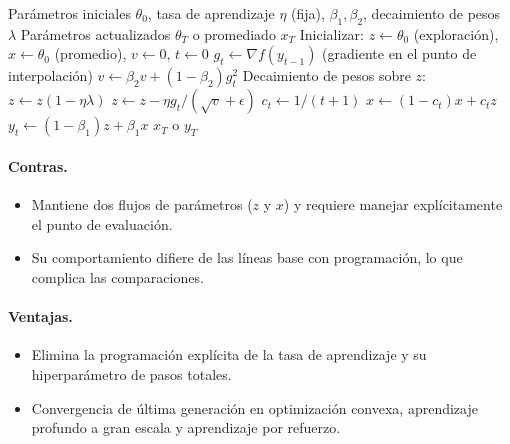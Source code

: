 \begin{algorithm}[H]
\caption{Schedule-Free AdamW}
\label{alg:schedulefree}
\begin{algorithmic}[1]
\Require Parámetros iniciales $\theta_0$, tasa de aprendizaje $\eta$ (fija), $\beta_1, \beta_2$, decaimiento de pesos $\lambda$
\Ensure Parámetros actualizados $\theta_T$ o promediado $x_T$
\State Inicializar: $z \gets \theta_0$ (exploración), $x \gets \theta_0$ (promedio), $v \gets 0$, $t \gets 0$
    \State $g_t \gets \nabla f(y_{t-1})$ (gradiente en el punto de interpolación)
    \State $v \gets \beta_2 v + (1-\beta_2) g_t^2$ 
    \State Decaimiento de pesos sobre $z$: $z \gets z(1 - \eta\lambda)$
    \State $z \gets z - \eta g_t / (\sqrt{v} + \epsilon)$ 
    \State $c_t \gets 1 / (t+1)$ 
    \State $x \gets (1-c_t) x + c_t z$ 
    \State $y_t \gets (1-\beta_1) z + \beta_1 x$ 
\EndFor
\Return $x_T$ o $y_T$
\end{algorithmic}
\end{algorithm}

\paragraph{Contras.}
\begin{itemize}[leftmargin=*]
\item Mantiene dos flujos de parámetros ($z$ y $x$) y requiere manejar explícitamente el punto de evaluación.
\item Su comportamiento difiere de las líneas base con programación, lo que complica las comparaciones.
\end{itemize}

\paragraph{Ventajas.}
\begin{itemize}[leftmargin=*]
\item Elimina la programación explícita de la tasa de aprendizaje y su hiperparámetro de pasos totales.
\item Convergencia de última generación en optimización convexa, aprendizaje profundo a gran escala y aprendizaje por refuerzo.
\end{itemize}

